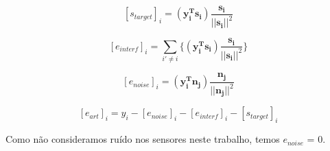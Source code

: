     \begin{equation}
        \label{eq:star}
         [s_{target}]_i  = (\mathbf{y_i^Ts_i})\frac{\mathbf{s_i}}{||\mathbf{s_i}||^2}
    \end{equation}
    
    \medskip
    
    \begin{equation}
        \label{eq:eint}
         [e_{interf}]_i  = \sum_{i' \neq i} \{(\mathbf{y_i^Ts_i})\frac{\mathbf{s_i}}{||\mathbf{s_i}||^2}\}
    \end{equation}
    
    \medskip
    
    \begin{equation}
        \label{eq:enoise}
         [e_{noise}]_i  = (\mathbf{y_i^Tn_j})\frac{\mathbf{n_j}}{||\mathbf{n_j}||^2}
    \end{equation}
    
    \medskip
    
        \begin{equation}
        \label{eq:eart}
         [e_{art}]_i  = y_i -  [e_{noise}]_i -  [e_{interf}]_i - [s_{target}]_i 
    \end{equation}
    
    Como não consideramos ruído nos sensores neste trabalho, temos $e_{noise}$ = 0.
    
    